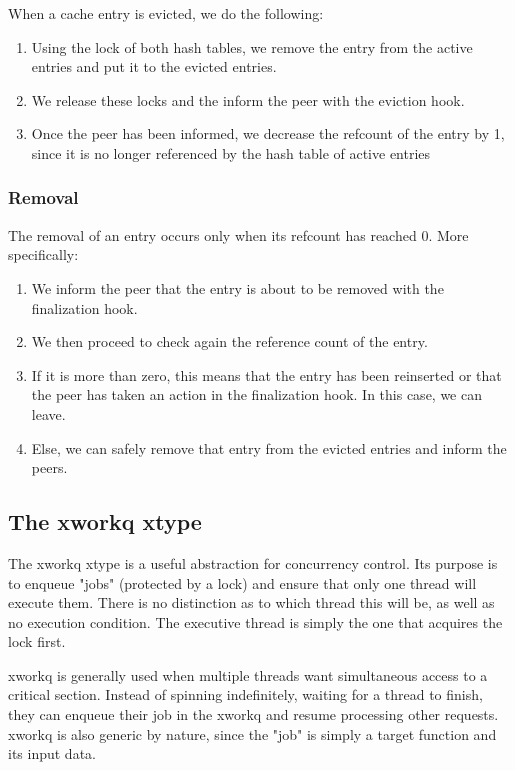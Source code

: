 When a cache entry is evicted, we do the following:

\begin{enumerate}
	\item Using the lock of both hash tables, we remove the entry from the 
		active entries and put it to the evicted entries.
	\item We release these locks and the inform the peer with the eviction 
		hook.
	\item Once the peer has been informed, we decrease the refcount of the
		entry by 1, since it is no longer referenced by the hash table 
		of active entries
\end{enumerate}

\subsubsection{Removal}

The removal of an entry occurs only when its refcount has reached 0. More 
specifically:

\begin{enumerate}
	\item We inform the peer that the entry is about to be removed with the
		finalization hook.
	\item We then proceed to check again the reference count of the entry.
	\item If it is more than zero, this means that the entry has been 
		reinserted or that the peer has taken an action in the 
		finalization hook. In this case, we can leave.
	\item Else, we can safely remove that entry from the evicted entries 
		and inform the peers.
\end{enumerate}

\subsection{The xworkq xtype}\label{sec:xworkq-design}

The xworkq xtype is a useful abstraction for concurrency control. Its purpose 
is to enqueue "jobs" (protected by a lock) and ensure that only one thread will 
execute them. There is no distinction as to which thread this will be, as well 
as no execution condition. The executive thread is simply the one that acquires 
the lock first.

xworkq is generally used when multiple threads want simultaneous access to a 
critical section. Instead of spinning indefinitely, waiting for a thread to 
finish, they can enqueue their job in the xworkq and resume processing other 
requests. xworkq is also generic by nature, since the "job" is simply a target 
function and its input data.

